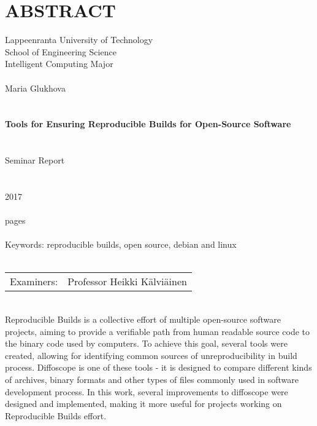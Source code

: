 \section*{ABSTRACT}

Lappeenranta University of Technology\\
School of Engineering Science\\
Intelligent Computing Major\\
\\

Maria Glukhova\\
\\
\\
\textbf{Tools for Ensuring Reproducible Builds for Open-Source Software}\\
\\
\\
Seminar Report\\
\\
\\
2017\\
\\
\pageref{LastPage} pages\\
\\
Keywords: reproducible builds, open source, debian and linux\\
\\

\begin{tabular}{l p{11.0cm}}  
  
Examiners: & Professor \foreignlanguage{finnish}{Heikki Kälviäinen}\\

\end {tabular}
\\

Reproducible Builds is a collective effort of multiple open-source software
projects, aiming to provide a verifiable path from human readable source code
to the binary code used by computers. To achieve this goal, several tools were
created, allowing for identifying common sources of unreproducibility in build
process.
Diffoscope is one of these tools - it is designed to compare different kinds of
archives, binary formats and other types of files commonly used in software
development process. In this work, several improvements to diffoscope were
designed and implemented, making it more useful for projects working on
Reproducible Builds effort.\\
